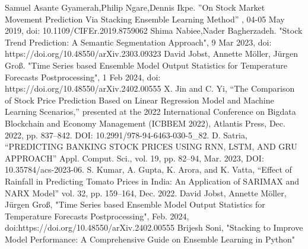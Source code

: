 \documentclass{ieeeojies}
\begin{document}
\begin{thebibliography}{00}
 Samuel Asante Gyamerah,Philip Ngare,Dennis Ikpe. ''On Stock Market Movement Prediction Via Stacking Ensemble Learning Method'' , 04-05 May 2019, doi: 10.1109/CIFEr.2019.8759062
 Shima Nabiee,Nader Bagherzadeh. "Stock Trend Prediction: A Semantic Segmentation Approach", 9 Mar 2023, doi: https://doi.org/10.48550/arXiv.2303.09323
 David Jobst, Annette Möller, Jürgen Groß. "Time Series based Ensemble Model Output Statistics for Temperature Forecasts Postprocessing", 1 Feb 2024, doi: https://doi.org/10.48550/arXiv.2402.00555
 X. Jin and C. Yi, “The Comparison of Stock Price Prediction Based on Linear Regression Model and Machine Learning Scenarios,” presented at the 2022 International Conference on Bigdata Blockchain and Economy Management (ICBBEM 2022), Atlantis Press, Dec. 2022, pp. 837–842. DOI: 10.2991/978-94-6463-030-5\_82.
 D. Satria, “PREDICTING BANKING STOCK PRICES USING RNN, LSTM, AND GRU APPROACH” Appl. Comput. Sci., vol. 19, pp. 82–94, Mar. 2023, DOI: 10.35784/acs-2023-06.
 S. Kumar, A. Gupta, K. Arora, and K. Vatta, “Effect of Rainfall in Predicting Tomato Prices in India: An Application of SARIMAX and NARX Model” vol. 32, pp. 159–164, Dec. 2022.
 David Jobst, Annette Möller, Jürgen Groß, "Time Series based
Ensemble Model Output Statistics for Temperature Forecasts Postprocessing", Feb. 2024, doi:https://doi.org/10.48550/arXiv.2402.00555 
 Brijesh Soni, "Stacking to Improve Model Performance: A Comprehensive Guide on Ensemble Learning in Python" 
\end{thebibliography}


\EOD
\end{document}
